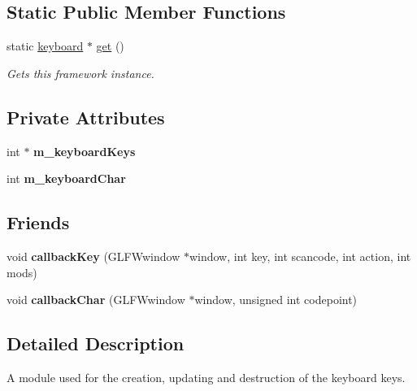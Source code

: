 \subsection*{Static Public Member Functions}
\begin{DoxyCompactItemize}
\item 
static \hyperlink{classflounder_1_1keyboard}{keyboard} $\ast$ \hyperlink{classflounder_1_1keyboard_a7493bf7e18bf4b5fc7679a3e8b10ec27}{get} ()
\begin{DoxyCompactList}\small\item\em Gets this framework instance. \end{DoxyCompactList}\end{DoxyCompactItemize}
\subsection*{Private Attributes}
\begin{DoxyCompactItemize}
\item 
\mbox{\label{classflounder_1_1keyboard_a001e792e18b8f7bf5814029e8684578b}} 
int $\ast$ {\bfseries m\+\_\+keyboard\+Keys}
\item 
\mbox{\label{classflounder_1_1keyboard_ad924b25ac04f2ff3ac3dfd73b262bc9b}} 
int {\bfseries m\+\_\+keyboard\+Char}
\end{DoxyCompactItemize}
\subsection*{Friends}
\begin{DoxyCompactItemize}
\item 
\mbox{\label{classflounder_1_1keyboard_a4fc7bca704eede3c7af007a9babe43cb}} 
void {\bfseries callback\+Key} (G\+L\+F\+Wwindow $\ast$window, int key, int scancode, int action, int mods)
\item 
\mbox{\label{classflounder_1_1keyboard_aa928e0a569bf298be38f2458799ea372}} 
void {\bfseries callback\+Char} (G\+L\+F\+Wwindow $\ast$window, unsigned int codepoint)
\end{DoxyCompactItemize}


\subsection{Detailed Description}
A module used for the creation, updating and destruction of the keyboard keys. 



